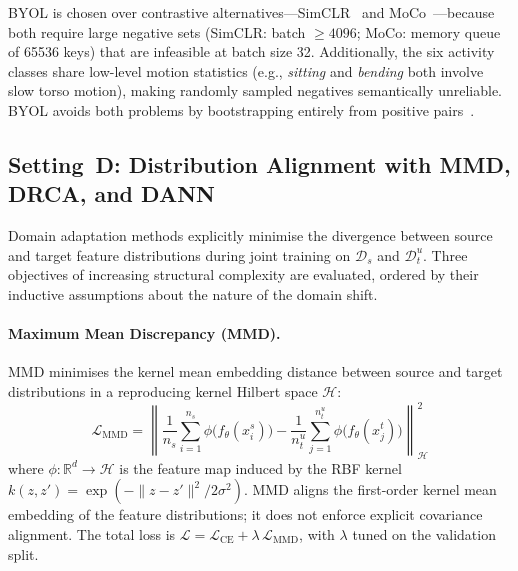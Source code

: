 \documentclass[english,bibtex]{kththesis}
\begin{document}
BYOL is chosen over contrastive alternatives---SimCLR~\cite{chen2020simclr} and MoCo~\cite{he2020moco}---because both require large negative sets (SimCLR: batch $\geq 4096$; MoCo: memory queue of 65536 keys) that are infeasible at batch size 32. Additionally, the six activity classes share low-level motion statistics (e.g., \textit{sitting} and \textit{bending} both involve slow torso motion), making randomly sampled negatives semantically unreliable. BYOL avoids both problems by bootstrapping entirely from positive pairs~\cite{grill2020byol}.

\subsection{Setting~D: Distribution Alignment with MMD, DRCA, and DANN}
\label{sec:domainadapt}

Domain adaptation methods explicitly minimise the divergence between source and target feature distributions during joint training on $\mathcal{D}_s$ and $\mathcal{D}_t^u$. Three objectives of increasing structural complexity are evaluated, ordered by their inductive assumptions about the nature of the domain shift.

\paragraph{Maximum Mean Discrepancy (MMD).}
MMD minimises the kernel mean embedding distance between source and target distributions in a reproducing kernel Hilbert space $\mathcal{H}$:
\begin{equation}
  \mathcal{L}_\text{MMD} =
  \left\|\frac{1}{n_s}\sum_{i=1}^{n_s}\phi\bigl(f_\theta(x_i^s)\bigr)
        -\frac{1}{n_t^u}\sum_{j=1}^{n_t^u}\phi\bigl(f_\theta(x_j^t)\bigr)
  \right\|_{\mathcal{H}}^2
\end{equation}
where $\phi:\mathbb{R}^d\!\to\!\mathcal{H}$ is the feature map induced by the RBF kernel $k(z,z')=\exp(-\|z{-}z'\|^2/2\sigma^2)$. MMD aligns the first-order kernel mean embedding of the feature distributions; it does not enforce explicit covariance alignment. The total loss is $\mathcal{L} = \mathcal{L}_\text{CE} + \lambda\,\mathcal{L}_\text{MMD}$, with $\lambda$ tuned on the validation split.
\end{document}
